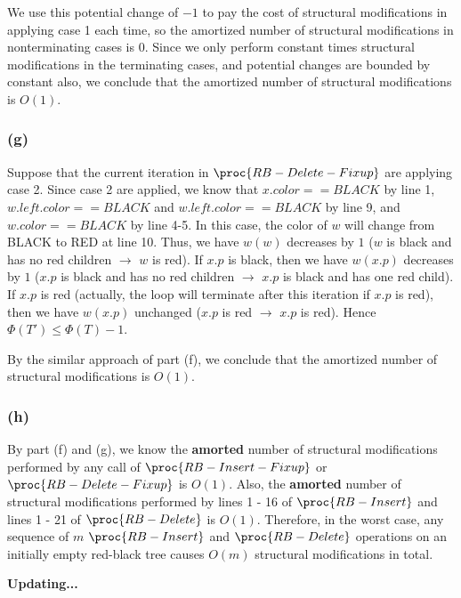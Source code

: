 We use this potential change of $-1$ to 
pay the cost of structural modifications in applying case 1 each time,
so the amortized number of structural modifications in nonterminating cases is $0$.
Since we only perform constant times structural modifications in the terminating cases,
and potential changes are bounded by constant also,
we conclude that the amortized number of structural modifications is $O(1)$.

\subsubsection*{(g)}

Suppose that the current iteration in $\proc{RB-Delete-Fixup}$ are applying case 2.
Since case 2 are applied, we know that $x.color == BLACK$ by line 1,
$w.left.color == BLACK$ and $w.left.color == BLACK$ by line 9,
and $w.color == BLACK$ by line 4-5.
In this case, the color of $w$ will change from BLACK to RED at line 10.
Thus, we have 
$w(w)$ decreases by $1$ ($w$ is black and has no red children $\rightarrow$ $w$ is red).
If $x.p$ is black, then we have $w(x.p)$ decreases by $1$ 
($x.p$ is black and has no red children $\rightarrow$ $x.p$ is black and has one red child).
If $x.p$ is red (actually, the loop will terminate after this iteration if $x.p$ is red), 
then we have $w(x.p)$ unchanged ($x.p$ is red $\rightarrow$ $x.p$ is red).
Hence $\Phi(T') \leq \Phi(T) - 1$.

By the similar approach of part (f),
we conclude that the amortized number of structural modifications is $O(1)$.

\subsubsection*{(h)}

By part (f) and (g), we know the \textbf{amorted} number of structural modifications performed by
any call of $\proc{RB-Insert-Fixup}$ or $\proc{RB-Delete-Fixup}$ is $O(1)$.
Also, the \textbf{amorted} number of structural modifications performed by 
lines 1 - 16 of $\proc{RB-Insert}$ and lines 1 - 21 of $\proc{RB-Delete}$ is $O(1)$.
Therefore, in the worst case, 
any sequence of $m$ $\proc{RB-Insert}$ and $\proc{RB-Delete}$ operations
on an initially empty red-black tree causes $O(m)$ structural modifications in total.

\centerline{\textbf{Updating...}}

